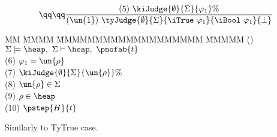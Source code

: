 \begin{flushleft}
\bigskip
\bigskip
$$
\qq \qq	\frac	
	{ (5) \ \kiJudge{\emptyset} {\Sigma} {\varphi_1} {\%} }
	{ (\un{1}) 
	  \ \tyJudge{\emptyset} {\Sigma} {\iTrue \ \varphi_1} {\iBool \ \varphi_1} {\bot}}
$$
\begin{tabbing}
MM \= MMMM \= MMMMMMMMMMMMMMMMMMM \= MMMMM  \kill
\>	() 	
		\> $\Sigma \models \heap, \ \Sigma \vdash \heap, \ \pnofab{t}$
		\>  
\\[1ex]
\>	(6) 	\> $\varphi_1 = \un{\rho}$	
		\>  
\\[1ex]
\>	(7) 	\> $\kiJudge{\emptyset} {\Sigma} {\un{\rho}} {\%}$
		\>  
\\[1ex]
\>	(8) 	\> $\un{\rho} \in \Sigma$
		\>  
\\[1ex]
\>	(9) 	\> $\rho \in \heap$	
		\>  
\\[1ex]
\>	(10)	\> $\pstep{H}{t}$	
		\> 
\end{tabbing}

\bigskip
\bigskip

Similarly to TyTrue case.
\bigskip

\clearpage{}



\end{flushleft}
